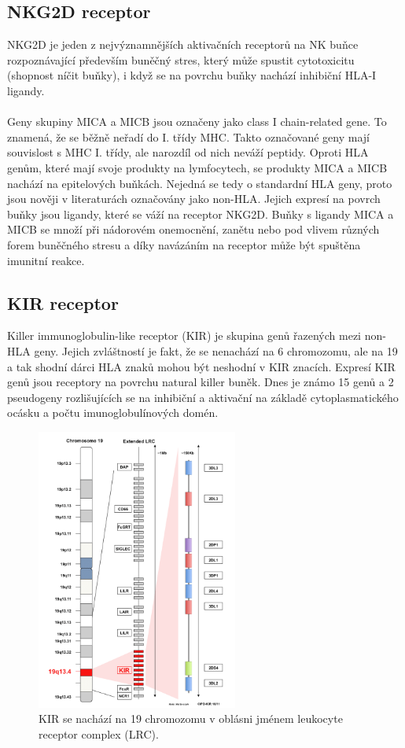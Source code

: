 \documentclass[czech,DP]{thesiskiv}
\numberwithin{equation}{section}
\begin{document}
\subsection{NKG2D receptor}
NKG2D je jeden z nejvýznamnějších aktivačních receptorů na NK buňce rozpoznávající především buněčný stres, který může spustit cytotoxicitu (shopnost níčit buňky), i když se na povrchu buňky nachází inhibiční HLA-I ligandy.  
\\
\\
Geny skupiny MICA a MICB jsou označeny jako class I chain-related gene. To znamená, že se běžně neřadí do I. třídy MHC. Takto označované geny mají souvislost s MHC I. třídy, ale narozdíl od nich neváží peptidy. Oproti HLA genům, které mají svoje produkty na lymfocytech, se produkty MICA a MICB nachází na epitelových buňkách. Nejedná se tedy o standardní HLA geny, proto jsou nověji v literaturách označovány jako non-HLA. Jejich expresí na povrch buňky jsou ligandy, které se váží na receptor NKG2D. Buňky s ligandy MICA a MICB se množí při nádorovém onemocnění, zanětu nebo pod vlivem různých forem buněčného stresu a díky navázáním na receptor může být spuštěna imunitní reakce. \cite{transfuzni_lekarstvi} \cite{MIC} \cite{NK_receptors} \cite{imgt_hla_database}


\subsection{KIR receptor}
Killer immunoglobulin-like receptor (KIR) je skupina genů řazených mezi non-HLA geny. Jejich zvláštností je fakt, že se nenachází na 6 chromozomu, ale na 19 a tak shodní dárci HLA znaků mohou být neshodní v KIR znacích. Expresí KIR genů jsou receptory na povrchu natural killer buněk. Dnes je známo 15 genů a 2 pseudogeny rozlišujících se na inhibiční a aktivační na základě cytoplasmatického ocásku a počtu imunoglobulínových domén. \citep{KIR_transplantace_jindra}

\begin{figure}[H]		
		\centering
		\includegraphics[width=250px]{./img/kir_pozice.png}
		\caption{KIR se nachází na 19 chromozomu v oblásni jménem leukocyte receptor complex (LRC). \cite{imgt_hla_database}}
		\label{fig:kir_position}
\end{figure}
\end{document}
